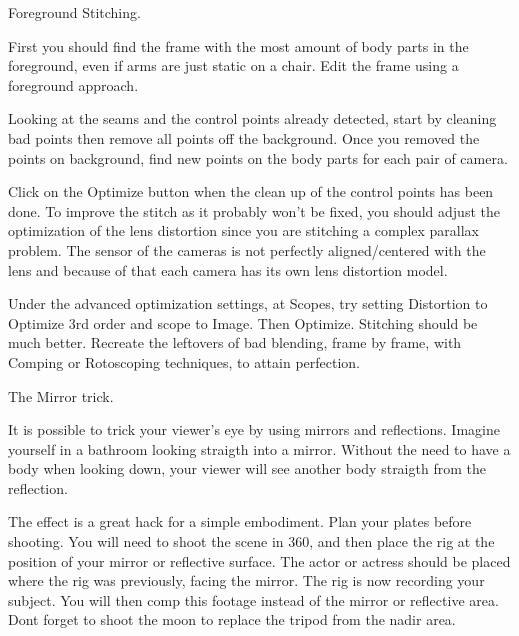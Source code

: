 \begin{fullwidth}

\clearpage
{\large Foreground Stitching. \par}

First you should find the frame with the most amount of body parts in the foreground, even if arms are just static on a chair. Edit the frame using a foreground approach.

Looking at the seams and the control points already detected, start by cleaning bad points then remove all points off the background. Once you removed the points on background, find new points on the body parts for each pair of camera.

Click on the Optimize button when the clean up of the control points has been done. To improve the stitch as it probably won’t be fixed, you should adjust the optimization of the lens distortion since you are stitching a complex parallax problem. The sensor of the cameras is not perfectly aligned/centered with the lens and because of that each camera has its own lens distortion model. 

Under the advanced optimization settings, at Scopes, try setting Distortion to Optimize 3rd order and scope to Image. Then Optimize. Stitching should be much better. Recreate the leftovers of bad blending, frame by frame, with Comping or Rotoscoping techniques, to attain perfection.

{\large The Mirror trick. \par}

It is possible to trick your viewer's eye by using mirrors and reflections. Imagine yourself in a bathroom looking straigth into a mirror. Without the need to have a body when looking down, your viewer will see another body straigth from the reflection. 

The effect is a great hack for a simple embodiment. Plan your plates before shooting. You will need to shoot the scene in 360, and then place the rig at the position of your mirror or reflective surface. The actor or actress should be placed where the rig was previously, facing the mirror. The rig is now recording your subject. You will then comp this footage instead of the mirror or reflective area. Dont forget to shoot the moon to replace the tripod from the nadir area.


\clearpage
\end{fullwidth}